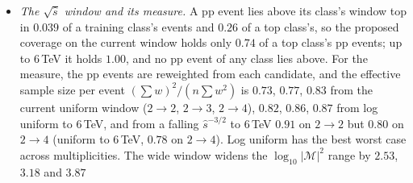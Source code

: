 \documentclass[11pt]{article}
\begin{document}
\begin{itemize}
    for hadronic $2\to2$, $2\to3$, $2\to4$), and the range of $\log_{10}|\mathcal M|^2$ ($0.1$ to $99.9\%$) widens by
    $1.19$, $1.08$ and $0.52$ decades, almost all of it at the top ($0.74$, $1.09$, $0.53$ on the maximum): the forward
    poles the current cut keeps out. The $e^+e^-$ classes change little ($0.06$, $0.14$, $0.03$ decades). At $2000$
    events the larger region is sampled more thinly: of the $2\to4$ pp events inside the proposed coverage, $0.956$ lie
    within the proposed sample's $|\mathcal M|^2$ range against $0.969$ inside the current one's.
  \item \emph{The $\sqrt{\hat s}$ window and its measure.} A pp event lies above its class's window top in $0.039$ of a
    training class's events and $0.26$ of a top class's, so the proposed coverage on the current window holds only
    $0.74$ of a top class's pp events; up to $6$\,TeV it holds $1.00$, and no pp event of any class lies above. For the
    measure, the pp events are reweighted from each candidate, and the effective sample size per event
    $(\sum w)^2/(n\sum w^2)$ is $0.73$, $0.77$, $0.83$ from the current uniform window ($2\to2$, $2\to3$, $2\to4$),
    $0.82$, $0.86$, $0.87$ from log uniform to $6$\,TeV, and from a falling $\hat s^{-3/2}$ to $6$\,TeV $0.91$ on
    $2\to2$ but $0.80$ on $2\to4$ (uniform to $6$\,TeV, $0.78$ on $2\to4$). Log uniform has the best worst case
    across multiplicities. The wide window widens the $\log_{10}|\mathcal M|^2$ range by $2.53$, $3.18$ and $3.87$

\end{itemize}
\end{document}
